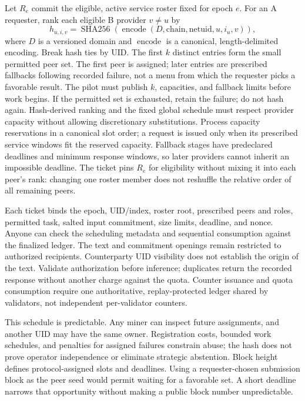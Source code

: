 Let \(R_e\) commit the eligible, active service roster fixed for epoch
\(e\). For an A requester, rank each eligible B provider \(v\ne u\) by
\begin{equation}\label{eq:peer-ranking}
 h_{u,i,v}=\operatorname{SHA256}\!\left(
 \operatorname{encode}(D,\mathrm{chain},\mathrm{netuid},u,i_u,v)
 \right),
\end{equation}
where \(D\) is a versioned domain and \(\operatorname{encode}\) is a
canonical, length-delimited encoding. Break hash ties by UID. The first
\(k\) distinct entries form the small permitted peer set. The first peer
is assigned; later entries are prescribed fallbacks following recorded
failure, not a menu from which the requester picks a favorable result.
The pilot must publish \(k\), capacities, and fallback limits before work
begins. If the permitted set is exhausted, retain the failure; do not
hash again. Hash-derived ranking and the fixed global schedule must
respect provider capacity without allowing discretionary substitutions.
Process capacity reservations in a canonical slot order; a request is
issued only when its prescribed service windows fit the reserved
capacity. Fallback stages have predeclared deadlines and minimum response
windows, so later providers cannot inherit an impossible deadline.
The ticket pins \(R_e\) for eligibility without mixing it into each
peer's rank: changing one roster member does not reshuffle the relative
order of all remaining peers.

Each ticket binds the epoch, UID/index, roster root, prescribed peers and roles,
permitted task, salted input commitment, size limits, deadline, and
nonce. Anyone can check the scheduling metadata and sequential
consumption against the finalized ledger. The text and commitment
openings remain restricted to authorized recipients. Counterparty UID
visibility does not establish the origin of the text. Validate
authorization before inference; duplicates return the recorded response
without another charge against the quota. Counter issuance and quota
consumption require one authoritative, replay-protected ledger shared
by validators, not independent per-validator counters.

This schedule is predictable. Any miner can inspect future assignments,
and another UID may have the same owner. Registration costs, bounded
work schedules, and penalties for assigned failures constrain abuse;
the hash does not prove operator independence or eliminate strategic
abstention. Block height defines protocol-assigned slots and deadlines.
Using a requester-chosen submission block as the peer seed would permit
waiting for a favorable set. A short deadline narrows that opportunity
without making a public block number unpredictable.

